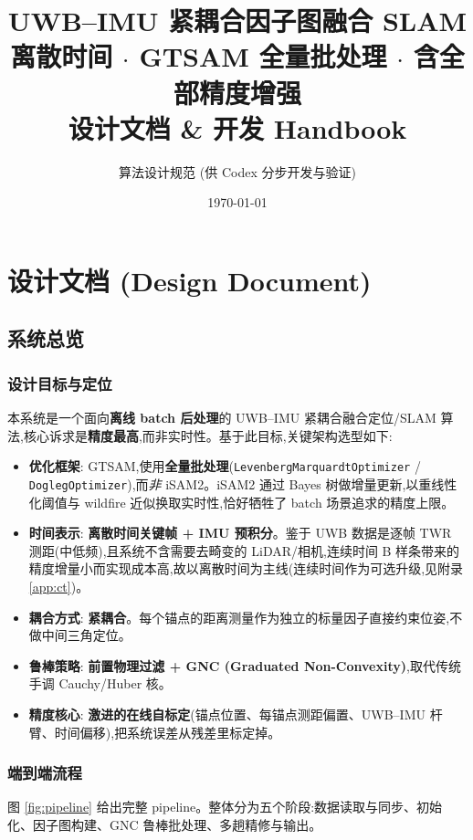 \documentclass[11pt,a4paper]{report}
\title{\textbf{UWB--IMU 紧耦合因子图融合 SLAM}\\[4pt]
\large 离散时间 $\cdot$ GTSAM 全量批处理 $\cdot$ 含全部精度增强\\[6pt]
\large 设计文档 \& 开发 Handbook}
\author{算法设计规范 (供 Codex 分步开发与验证)}
\date{\today}
\begin{document}
\hypersetup{pageanchor=false}
\maketitle
\tableofcontents
\clearpage
\hypersetup{pageanchor=true}

\part{设计文档 (Design Document)}

\chapter{系统总览}

\section{设计目标与定位}
本系统是一个面向\textbf{离线 batch 后处理}的 UWB--IMU 紧耦合融合定位/SLAM 算法,核心诉求是\textbf{精度最高},而非实时性。基于此目标,关键架构选型如下:

\begin{itemize}[leftmargin=2em]
  \item \textbf{优化框架}: GTSAM,使用\textbf{全量批处理}(\texttt{LevenbergMarquardtOptimizer} / \texttt{DoglegOptimizer}),而\emph{非} iSAM2。iSAM2 通过 Bayes 树做增量更新,以重线性化阈值与 wildfire 近似换取实时性,恰好牺牲了 batch 场景追求的精度上限。
  \item \textbf{时间表示}: \textbf{离散时间关键帧 + IMU 预积分}。鉴于 UWB 数据是逐帧 TWR 测距(中低频),且系统不含需要去畸变的 LiDAR/相机,连续时间 B 样条带来的精度增量小而实现成本高,故以离散时间为主线(连续时间作为可选升级,见附录 \ref{app:ct})。
  \item \textbf{耦合方式}: \textbf{紧耦合}。每个锚点的距离测量作为独立的标量因子直接约束位姿,不做中间三角定位。
  \item \textbf{鲁棒策略}: \textbf{前置物理过滤 + GNC (Graduated Non-Convexity)},取代传统手调 Cauchy/Huber 核。
  \item \textbf{精度核心}: \textbf{激进的在线自标定}(锚点位置、每锚点测距偏置、UWB--IMU 杆臂、时间偏移),把系统误差从残差里标定掉。
\end{itemize}

\section{端到端流程}
图 \ref{fig:pipeline} 给出完整 pipeline。整体分为五个阶段:数据读取与同步、初始化、因子图构建、GNC 鲁棒批处理、多趟精修与输出。
\end{document}
